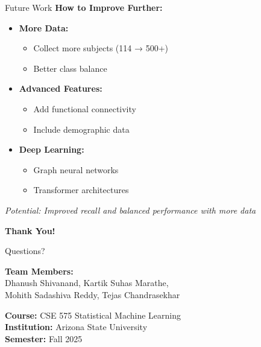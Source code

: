 \documentclass{beamer}
\begin{document}
\begin{frame}{Future Work}
\textbf{How to Improve Further:}

\begin{itemize}
  \item \textbf{More Data:}
  \begin{itemize}
    \item Collect more subjects (114 → 500+)
    \item Better class balance
  \end{itemize}
  
  \vspace{0.3cm}
  
  \item \textbf{Advanced Features:}
  \begin{itemize}
    \item Add functional connectivity
    \item Include demographic data
  \end{itemize}
  
  \vspace{0.3cm}
  
  \item \textbf{Deep Learning:}
  \begin{itemize}
    \item Graph neural networks
    \item Transformer architectures
  \end{itemize}
\end{itemize}

\vskip 0.5cm
\centering
\textit{Potential: Improved recall and balanced performance with more data}
\end{frame}

\begin{frame}[plain]
\begin{center}
\Huge \textbf{Thank You!}

\vspace{1.5cm}

\Large Questions?

\vspace{1.5cm}

\normalsize
\textbf{Team Members:}
\\
Dhanush Shivanand, Kartik Suhas Marathe,
\\
Mohith Sadashiva Reddy, Tejas Chandrasekhar

\vspace{0.8cm}

\textbf{Course:} CSE 575 Statistical Machine Learning
\\
\textbf{Institution:} Arizona State University
\\
\textbf{Semester:} Fall 2025
\end{center}
\end{frame}
\end{document}
